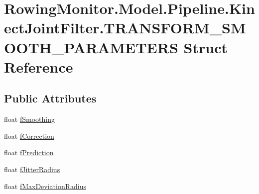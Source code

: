 \hypertarget{struct_rowing_monitor_1_1_model_1_1_pipeline_1_1_kinect_joint_filter_1_1_t_r_a_n_s_f_o_r_m___s_m_o_o_t_h___p_a_r_a_m_e_t_e_r_s}{}\section{Rowing\+Monitor.\+Model.\+Pipeline.\+Kinect\+Joint\+Filter.\+T\+R\+A\+N\+S\+F\+O\+R\+M\+\_\+\+S\+M\+O\+O\+T\+H\+\_\+\+P\+A\+R\+A\+M\+E\+T\+E\+RS Struct Reference}
\label{struct_rowing_monitor_1_1_model_1_1_pipeline_1_1_kinect_joint_filter_1_1_t_r_a_n_s_f_o_r_m___s_m_o_o_t_h___p_a_r_a_m_e_t_e_r_s}
\subsection*{Public Attributes}
\begin{DoxyCompactItemize}
\item 
float \hyperlink{struct_rowing_monitor_1_1_model_1_1_pipeline_1_1_kinect_joint_filter_1_1_t_r_a_n_s_f_o_r_m___s_m_o_o_t_h___p_a_r_a_m_e_t_e_r_s_a3df04b87ddfcaabc9b88f91270460add}{f\+Smoothing}
\item 
float \hyperlink{struct_rowing_monitor_1_1_model_1_1_pipeline_1_1_kinect_joint_filter_1_1_t_r_a_n_s_f_o_r_m___s_m_o_o_t_h___p_a_r_a_m_e_t_e_r_s_a9d5f856bec242947352351a8e60560ce}{f\+Correction}
\item 
float \hyperlink{struct_rowing_monitor_1_1_model_1_1_pipeline_1_1_kinect_joint_filter_1_1_t_r_a_n_s_f_o_r_m___s_m_o_o_t_h___p_a_r_a_m_e_t_e_r_s_a7333c909fc6d7470548c458ddd01b259}{f\+Prediction}
\item 
float \hyperlink{struct_rowing_monitor_1_1_model_1_1_pipeline_1_1_kinect_joint_filter_1_1_t_r_a_n_s_f_o_r_m___s_m_o_o_t_h___p_a_r_a_m_e_t_e_r_s_a336103e401e4fce01b7c5a9368908414}{f\+Jitter\+Radius}
\item 
float \hyperlink{struct_rowing_monitor_1_1_model_1_1_pipeline_1_1_kinect_joint_filter_1_1_t_r_a_n_s_f_o_r_m___s_m_o_o_t_h___p_a_r_a_m_e_t_e_r_s_a2c603efc3e88f34da44904f19060e9f1}{f\+Max\+Deviation\+Radius}
\end{DoxyCompactItemize}


